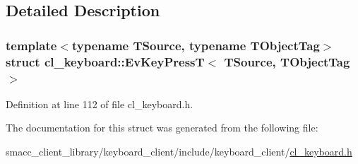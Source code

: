 \subsection{Detailed Description}
\subsubsection*{template$<$typename T\+Source, typename T\+Object\+Tag$>$\newline
struct cl\+\_\+keyboard\+::\+Ev\+Key\+Press\+T$<$ T\+Source, T\+Object\+Tag $>$}



Definition at line 112 of file cl\+\_\+keyboard.\+h.



The documentation for this struct was generated from the following file\+:\begin{DoxyCompactItemize}
\item 
smacc\+\_\+client\+\_\+library/keyboard\+\_\+client/include/keyboard\+\_\+client/\hyperlink{cl__keyboard_8h}{cl\+\_\+keyboard.\+h}\end{DoxyCompactItemize}
